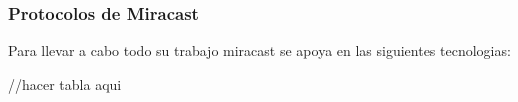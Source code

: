 \begin{frame}
  \frametitle{Protocolos de Miracast}
  Para llevar a cabo todo su trabajo miracast se apoya en las siguientes tecnologias:

  //hacer tabla aqui
\end{frame}
